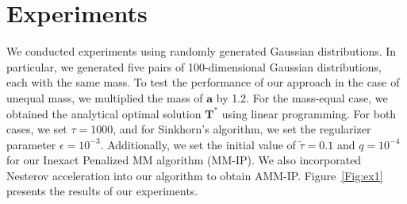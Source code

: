 \documentclass[conference]{IEEEtran}
\newcommand{\mat}[1]{\mathbf{#1}}
\renewcommand{\vec}[1]{\bm{#1}}
\begin{document}
\section{Experiments}

We conducted experiments using randomly generated Gaussian distributions. In particular, we generated five pairs of 100-dimensional Gaussian distributions, each with the same mass. To test the performance of our approach in the case of unequal mass, we multiplied the mass of $\vec a$ by 1.2. For the mass-equal case, we obtained the analytical optimal solution $\mat T^{*}$ using linear programming. For both cases, we set $\tau = 1000$, and for Sinkhorn's algorithm, we set the regularizer parameter $\epsilon = 10^{-3}$. Additionally, we set the initial value of $\tilde{\tau} = 0.1$ and $q = 10^{-4}$ for our Inexact Penalized MM algorithm (MM-IP). We also incorporated Nesterov acceleration into our algorithm to obtain AMM-IP. Figure~\ref{Fig:ex1} presents the results of our experiments.
\end{document}
